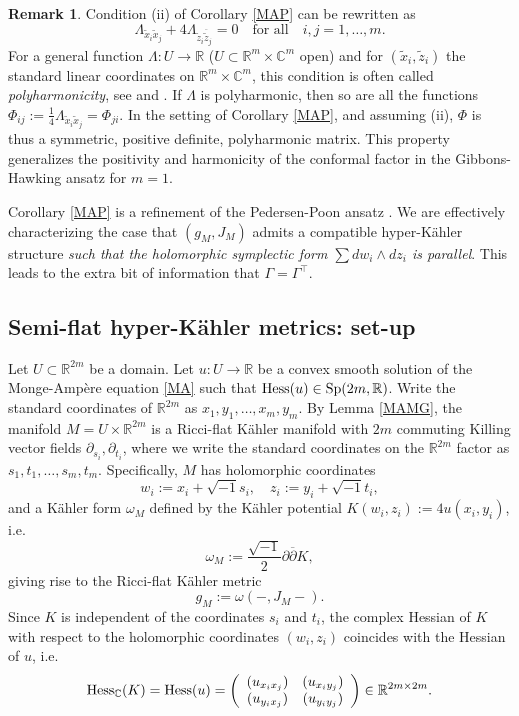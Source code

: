 \documentclass[11pt,reqno]{amsart}
\newcommand{\C}{\mathbb{C}}
\newcommand{\R}{\mathbb{R}}
\theoremstyle{plain}
\theoremstyle{definition}
\newtheorem{remark}[theorem]{Remark}
\numberwithin{equation}{section}
\begin{document}
\begin{remark}\label{polyharm}
  Condition (ii) of Corollary \ref{MAP} can be rewritten as 
  $$\Lambda_{\tilde{x}_i\tilde{x}_j} + 4 \Lambda_{\tilde{z}_i\overline{\tilde{z}}_j} = 0 \quad \text{for all} \quad i,j=1,\ldots,m.$$
  For a general function $\Lambda: U \to \R$ ($U \subset \R^m \times \C^m$ open) and for $(\tilde{x}_i,\tilde{z}_i)$ the standard linear coordinates on $\R^m \times \C^m$, this condition is often called \emph{polyharmonicity}, see \cite[p. 505]{Bie} and \cite[Eq. 2.1]{HKLR}. If $\Lambda$ is polyharmonic, then so are all the functions $\Phi_{ij} := \frac{1}{4} \Lambda_{\tilde{x}_i\tilde{x}_j} = \Phi_{ji}$. In the setting of Corollary \ref{MAP}, and assuming (ii), $\Phi$ is thus a symmetric, positive definite, polyharmonic matrix. This property generalizes the positivity and harmonicity of the conformal factor in the Gibbons-Hawking ansatz for $m = 1$.
\end{remark}

Corollary \ref{MAP} is a refinement of the Pedersen-Poon ansatz \cite{PP}. We are effectively characterizing the case that $(g_M,J_M)$ admits a compatible hyper-Kähler structure \emph{such that the holomorphic symplectic form $\sum dw_i \wedge dz_i$ is parallel}. This leads to the extra bit of information that $\Gamma = \Gamma^\top$.

\subsection{Semi-flat hyper-Kähler metrics: set-up}

Let $U\subset\R^{2m}$ be a domain. Let $u:U\to \R$ be a convex smooth solution of the Monge-Ampère equation \eqref{MA} such that ${\rm Hess}(u)\in\text{Sp}(2m,\R)$. Write the standard coordinates of $\mathbb{R}^{2m}$ as $x_1,y_1,\ldots,x_m,y_m$. By Lemma \ref{MAMG}, the manifold $M=U\times \R^{2m}$ is a Ricci-flat Kähler manifold with $2m$ commuting Killing vector fields $\partial_{s_i}, \partial_{t_i}$, where we write the standard coordinates on the $\mathbb{R}^{2m}$ factor as $s_1,t_1,\ldots,s_m,t_m$. Specifically, $M$ has holomorphic coordinates
$$w_{i}:=x_{i}+\sqrt{-1} s_{i},\quad    z_{i}:=y_{i}+\sqrt{-1} t_{i},$$ 
and a Kähler form $\omega_M$ defined by the Kähler potential $K(w_{i},z_{i}):=4u(x_{i},y_{i})$, i.e.
$$\omega_M := \frac{\sqrt{-1}}{2}\partial\overline\partial K,$$
giving rise to the Ricci-flat Kähler metric 
$$g_{M}:=\omega(-,J_M-).$$ 
Since $K$ is independent of the coordinates $s_{i}$ and $t_{i}$, the complex Hessian of $K$ with respect to the holomorphic coordinates $(w_{i},z_{i})$ coincides with the Hessian of $u$, i.e.
\begin{align*}
    {\rm Hess}_{\C}(K)={\rm Hess}(u)=\left(\begin{array}{cc}
       (u_{x_{i}x_{j}}) & (u_{x_{i}y_{j}}) \\
        (u_{y_{i}x_{j}}) & (u_{y_{i}y_{j}})
    \end{array}\right) \in \R^{2m\times 2m}.
\end{align*}
\end{document}
